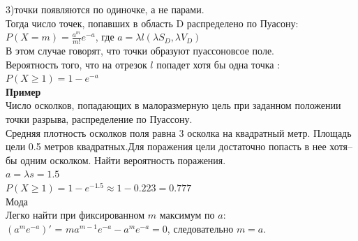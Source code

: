 \documentclass[russian, 12pt, fleqn,x11names]{article}
\begin{document}
3)точки появляются по одиночке, а не парами.\\
Тогда число точек, попавших в область D распределено по Пуасону: \\$P(X=m) = \frac{a^m}{m!}e^{-a}$, где $a=\lambda l(\lambda S_D, \lambda V_D)$\\
В этом случае говорят, что точки образуют пуассоновсое поле.\\
Вероятность того, что на отрезок $l$ попадет хотя бы одна точка :\\ $P(X\geq1) = 1 - e^{-a}$\\
\textbf{Пример} \\
Число осколков, попадающих в малоразмерную цель при заданном положении точки разрыва, распределение по Пуассону.\\
Средняя плотность осколков поля равна 3 осколка на квадратный метр. Площадь цели 0.5 метров квадратных.Для поражения цели достаточно попасть в нее хотя--бы одним осколком. Найти вероятность поражения.\\
$a=\lambda s =1.5$\\
$P(X\geq1)=1 - e^{-1.5} \approx 1 - 0.223 = 0.777$\\
Мода\\
Легко найти при фиксированном $m$ максимум по $a$:\\
$(a^me^{-a})'$ = $ma^{m-1}e^{-a} - a^me^{-a} = 0$, следовательно $m = a$.
\end{document}
